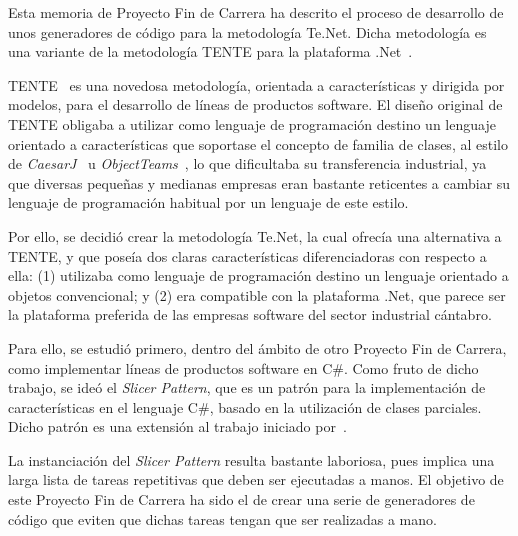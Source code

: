 
Esta memoria de Proyecto Fin de Carrera ha descrito el proceso de desarrollo de unos generadores de código para la metodología Te.Net. Dicha metodología es una variante de la metodología TENTE para la plataforma .Net~\citep{chappell:2006}.

TENTE~\citep{fuentes:2009:caise,sanchez:2011:tente} es una novedosa metodología, orientada a características y dirigida por modelos, para el desarrollo de líneas de productos software. El diseño original de TENTE obligaba a utilizar como lenguaje de programación destino un lenguaje orientado a características que soportase el concepto de familia de clases, al estilo de \emph{CaesarJ}~\citep{aracic:2006} u \emph{ObjectTeams}~\citep{stephan:2002}, lo que dificultaba su transferencia industrial, ya que diversas pequeñas y medianas empresas eran bastante reticentes a cambiar su lenguaje de programación habitual por un lenguaje de este estilo.

Por ello, se decidió crear la metodología Te.Net, la cual ofrecía una alternativa a TENTE, y que poseía dos claras características diferenciadoras con respecto a ella: (1) utilizaba como lenguaje de programación destino un lenguaje orientado a objetos convencional; y (2) era compatible con la plataforma .Net, que parece ser la plataforma preferida de las empresas software del sector industrial cántabro.

Para ello, se estudió primero, dentro del ámbito de otro Proyecto Fin de Carrera, como implementar líneas de productos software en C\#. Como fruto de dicho trabajo, se ideó el \emph{Slicer Pattern}, que es un patrón para la implementación de características en el lenguaje C\#, basado en la utilización de clases parciales. Dicho patrón es una extensión al trabajo iniciado por~\cite{laguna:2010}.

La instanciación del \emph{Slicer Pattern} resulta bastante laboriosa, pues implica una larga lista de tareas repetitivas que deben ser ejecutadas a manos. El objetivo de este Proyecto Fin de Carrera ha sido el de crear una serie de generadores de código que eviten que dichas tareas tengan que ser realizadas a mano.

